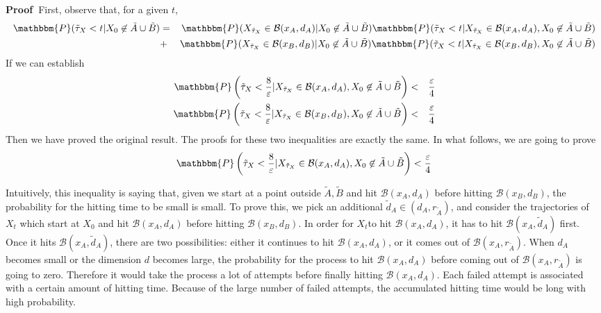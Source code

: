 \documentclass[english, aip, jcp, priprint, graphicx,floatfix]{revtex4-1}
\newcommand{\nin}{\not\in}
\theoremstyle{plain}
\theoremstyle{definition}
\theoremstyle{plain}
\begin{document}
\noindent\textbf{Proof\ }First, observe that, for a given $t$,
\begin{eqnarray*}
\mathbbm{P} (\tilde{\tau}_X < t|X_0 \nin \tilde{A} \cup \tilde{B}) & = &
\mathbbm{P} (X_{\tilde{\tau}_X} \in \mathcal{B} (x_A, d_A) |X_0 \nin
\tilde{A} \cup \tilde{B}) \mathbbm{P} (\tilde{\tau}_X < t|X_{\tilde{\tau}_X}
\in \mathcal{B} (x_A, d_A), X_0 \nin \tilde{A} \cup \tilde{B})\\
& + & \mathbbm{P} (X_{\tilde{\tau}_X} \in \mathcal{B} (x_B, d_B) |X_0 \nin
\tilde{A} \cup \tilde{B}) \mathbbm{P} (\tilde{\tau}_X < t|X_{\tilde{\tau}_X}
\in \mathcal{B} (x_B, d_B), X_0 \nin \tilde{A} \cup \tilde{B})
\end{eqnarray*}
If we can establish
\begin{eqnarray*}
\mathbbm{P} \left( \tilde{\tau}_X < \frac{8}{\varepsilon}
|X_{\tilde{\tau}_X} \in \mathcal{B} (x_A, d_A), X_0 \nin \tilde{A} \cup
\tilde{B} \right) & < & \frac{\varepsilon}{4}\\
\mathbbm{P} \left( \tilde{\tau}_X < \frac{8}{\varepsilon}
|X_{\tilde{\tau}_X} \in \mathcal{B} (x_B, d_B), X_0 \nin \tilde{A} \cup
\tilde{B} \right) & < & \frac{\varepsilon}{4}
\end{eqnarray*}
Then we have proved the original result. The proofs for these two inequalities
are exactly the same. In what follows, we are going to prove
\[ \mathbbm{P} \left( \tilde{\tau}_X < \frac{8}{\varepsilon}
|X_{\tilde{\tau}_X} \in \mathcal{B} (x_A, d_A), X_0 \nin \tilde{A} \cup
\tilde{B} \right) < \frac{\varepsilon}{4} \]


Intuitively, this inequality is saying that, given we start at a point outside
$\tilde{A}, \tilde{B}$ and hit $\mathcal{B} (x_A, d_A)$ before hitting
$\mathcal{B} (x_B, d_B)$, the probability for the hitting time to be small is
small. To prove this, we pick an additional $\tilde{d}_A \in (d_A,
r_{\tilde{A}})$, and consider the trajectories of $X_t$ which start at $X_0$
and hit $\mathcal{B} (x_A, d_A)$ before hitting $\mathcal{B} (x_B, d_B)$. In
order for $X_t $to hit $\mathcal{B} (x_A, d_A)$, it has to hit $\mathcal{B}
(x_A, \tilde{d}_A)$ first. Once it hits $\mathcal{B} (x_A, \tilde{d}_A)$,
there are two possibilities: either it continues to hit $\mathcal{B} (x_A,
d_A)$, or it comes out of $\mathcal{B} (x_A, r_{\tilde{A}})$. When $d_A$
becomes small or the dimension $d$ becomes large, the probability for the
process to hit $\mathcal{B} (x_A, d_A)$ before coming out of $\mathcal{B}
(x_A, r_{\tilde{A}})$ is going to zero. Therefore it would take the process a
lot of attempts before finally hitting $\mathcal{B} (x_A, d_A)$. Each failed
attempt is associated with a certain amount of hitting time. Because of the
large number of failed attempts, the accumulated hitting time would be long
with high probability.
\end{document}
